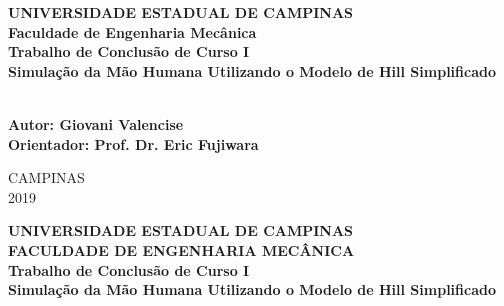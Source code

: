 \begin{center}
\vspace*{5cm}
{\fontsize{14}{14} \textbf{UNIVERSIDADE ESTADUAL DE CAMPINAS}}	\\ 
\vspace{0.6ex}
{\fontsize{14}{14} \textbf{Faculdade de Engenharia Mecânica}}	\\ 
\vspace{3cm}
{\fontsize{12}{12} \textbf{Trabalho de Conclusão de Curso I}}	\\
\vspace{3cm}
{\fontsize{23}{23} \textbf{Simulação da Mão Humana Utilizando o Modelo de Hill Simplificado}}\\
\vspace{1.6ex}
{\fontsize{23}{23} \textbf{}}\\ 
\end{center}
\vspace{3cm}
\begin{flushright}
{\fontsize{12}{12} \textbf{Autor: Giovani Valencise}}\\ 
{\fontsize{12}{12} \textbf{Orientador: Prof. Dr. Eric Fujiwara}}\\
\end{flushright}
\vspace{2cm}
\begin{center}
CAMPINAS\\ 
2019
\end{center}


\clearpage
\thispagestyle{plain}



\begin{center}
\vspace*{0.8cm}

{\fontsize{14}{14} \textbf{UNIVERSIDADE ESTADUAL DE CAMPINAS}}	\\
{\fontsize{14}{14} \textbf{FACULDADE DE ENGENHARIA MECÂNICA}}	\\

\vspace{3cm}
{\fontsize{12}{12} \textbf{Trabalho de Conclusão de Curso I}}	\\
\vspace{3cm}
{\fontsize{23}{23} \textbf{Simulação da Mão Humana Utilizando o Modelo de Hill Simplificado}}\\
\end{center}

